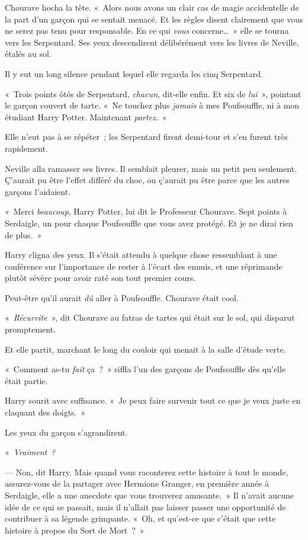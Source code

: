 Chourave hocha la tête. «~Alors nous avons un clair cas de magie accidentelle de la part d'un garçon qui se sentait menacé. Et les règles disent clairement que vous ne serez pas tenu pour responsable. En ce qui \emph{vous} concerne…~» elle se tourna vers les Serpentard. Ses yeux descendirent délibérément vers les livres de Neville, étalés au sol.

Il y eut un long silence pendant lequel elle regarda les cinq Serpentard.

«~Trois points ôtés de Serpentard, \emph{chacun}, dit-elle enfin. Et six de \emph{lui}~», pointant le garçon couvert de tarte. «~Ne touchez plus \emph{jamais} à mes Poufsouffle, ni à mon étudiant Harry Potter. Maintenant \emph{partez}.~»

Elle n'eut pas à se répéter~; les Serpentard firent demi-tour et s'en furent très rapidement.

Neville alla ramasser ses livres. Il semblait pleurer, mais un petit peu seulement. Ç'aurait pu être l'effet différé du choc, ou ç'aurait pu être parce que les autres garçons l'aidaient.

«~Merci \emph{beaucoup}, Harry Potter, lui dit le Professeur Chourave. Sept points à Serdaigle, un pour chaque Poufsouffle que vous avez protégé. Et je ne dirai rien de plus.~»

Harry cligna des yeux. Il s'était attendu à quelque chose ressemblant à une conférence sur l'importance de rester à l'écart des ennuis, et une réprimande plutôt sévère pour avoir raté son tout premier cours.

Peut-être qu'il aurait \emph{dû} aller à Poufsouffle. Chourave était cool.

«~\emph{Récurvite}~», dit Chourave au fatras de tartes qui était sur le sol, qui disparut promptement.

Et elle partit, marchant le long du couloir qui menait à la salle d'étude verte.

«~Comment as-tu \emph{fait} ça~?~» siffla l'un des garçons de Poufsouffle dès qu'elle était partie.

Harry sourit avec suffisance. «~Je peux faire survenir tout ce que je veux juste en claquant des doigts.~»

Les yeux du garçon s'agrandirent.

«~\emph{Vraiment~?}

--- Non, dit Harry. Mais quand vous raconterez cette histoire à tout le monde, assurez-vous de la partager avec Hermione Granger, en première année à Serdaigle, elle a une anecdote que vous trouverez amusante.~» Il n'avait aucune idée de ce qui se passait, mais il n'allait pas laisser passer une opportunité de contribuer à sa légende grimpante. «~Oh, et qu'est-ce que c'était que cette histoire à propos du Sort de Mort~?~»

